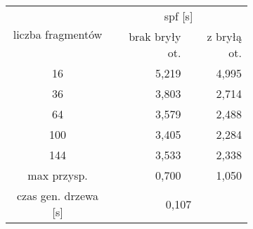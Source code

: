 \begin{figure}[!htb]
\advance\leftskip-2cm
	\begin{subfigure}{.5\textwidth}
	\end{subfigure}
	\hspace{2cm}
	\begin{subfigure}{.5\textwidth}
	\begin{longtable}{|c|r|r|} \hline
	    \multirow{2}{*}{liczba fragmentów} & \multicolumn{2}{|c|}{spf [s]} \\ \cline{2-3}
	    & brak bryły ot. & z bryłą ot. \\ \hline
	    16 & 5,219 & 4,995 \\ 
	    36 & 3,803 & 2,714 \\
		64 & 3,579 & 2,488 \\
		100 & 3,405 & 2,284 \\
		144 & 3,533 & 2,338 \\ \hline
		max przysp. & 0,700 & 1,050 \\ \hline
		czas gen. drzewa [s] &  \multicolumn{2}{|c|}{0,107} \\ \hline
	\end{longtable}
\end{subfigure}
\end{figure}
\pagebreak
